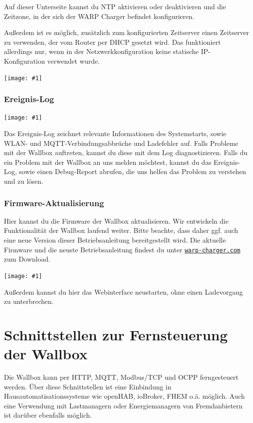 \documentclass[a4paper,10pt]{article}
\newcommand{\gfx}[1]{\texttt{[image: \#1]}}
\newcommand\rurl[2]{%
  \href{#1}{\nolinkurl{#2}}%
}
\begin{document}
\begin{multicols*}{2}
    Auf dieser Unterseite kannst du NTP aktivieren oder deaktivieren und die Zeitzone, in der sich
    der WARP Charger befindet konfigurieren.

    Außerdem ist es möglich, zusätzlich zum konfigurierten Zeitserver einen Zeitserver zu verwenden, der vom Router per DHCP gesetzt wird. Das funktioniert allerdings nur, wenn in der Netzwerkkonfiguration keine statische IP-Konfiguration verwendet wurde.

    \gfx{./img_warp2/resized/web_ntp}

    \subsubsection{Ereignis-Log}
    \gfx{./img_warp2/resized/web_event_log}

    Das Ereignis-Log zeichnet relevante Informationen des Systemstarts, sowie WLAN- und MQTT-Verbindungsabbrüche und Ladefehler auf.
    Falls Probleme mit der Wallbox auftreten, kannst du diese mit dem Log diagnostizieren.
    Falls du ein Problem mit der Wallbox an uns melden möchtest, kannst du das Ereignis-Log,
    sowie einen Debug-Report abrufen, die uns helfen das Problem zu verstehen und zu lösen.

    \subsubsection{Firmware-Aktualisierung}\label{firmware-update}
    Hier kannst du die Firmware der Wallbox aktualisieren. Wir entwickeln die Funktionalität
    der Wallbox laufend weiter. Bitte beachte, dass daher ggf. auch eine neue
    Version dieser Betriebsanleitung bereitgestellt wird.
    Die aktuelle Firmware und die neuste Betriebsanleitung findest du unter
    \rurl{https://warp-charger.com}{warp-charger.com} zum Download.

    \gfx{./img_warp2/resized/web_firmware_update}

    Außerdem kannst du hier das Webinterface neustarten, ohne einen Ladevorgang zu unterbrechen.

    \newpage

    \section{Schnittstellen zur Fernsteuerung der Wallbox}\label{interfaces}
    Die Wallbox kann per HTTP, MQTT, Modbus/TCP und OCPP ferngesteuert werden. Über diese Schnittstellen ist eine
    Einbindung in Hausautomatisationssysteme wie openHAB, ioBroker, FHEM o.ä.
    möglich. Auch eine Verwendung mit Lastmanagern oder Energiemanagern von Fremdanbietern
    ist darüber ebenfalls möglich.


\end{multicols*}
\end{document}
